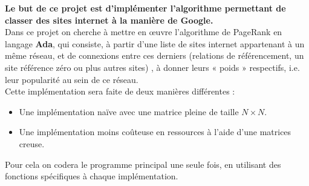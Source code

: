 
\textbf{Le but de ce projet est d'implémenter l'algorithme permettant de classer des sites internet à la manière de Google.}\\
Dans ce projet on cherche à mettre en œuvre l’algorithme de PageRank en langage \textbf{Ada}, qui consiste, à partir d’une liste de sites internet appartenant 
à un même réseau, et de connexions entre ces derniers (relations de référencement, un site référence zéro ou plus autres sites) , à donner leurs « poids » respectifs, i.e. leur 
popularité au sein de ce réseau. \\

Cette implémentation sera faite de deux manières différentes : 
\begin{itemize}
   \item Une implémentation naïve avec une matrice pleine de taille $N \times N$.
   \item Une implémentation moins coûteuse en ressources à l'aide d'une matrices creuse.
\end{itemize}

Pour cela on codera le programme principal une seule fois, en utilisant des fonctions spécifiques à chaque implémentation.